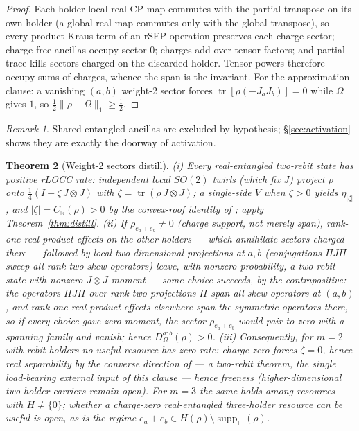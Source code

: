 \documentclass[11pt]{article}
\theoremstyle{plain}
\newtheorem{theorem}{Theorem}[section]
\theoremstyle{definition}
\theoremstyle{remark}
\newtheorem{remark}[theorem]{Remark}
\theoremstyle{plain}
\newcommand{\tr}{\operatorname{tr}}
\newcommand{\R}{\mathbb{R}}
\newcommand{\F}{\mathbb{F}}
\newcommand{\Om}{\Omega}
\newcommand{\suppF}{\operatorname{supp}_{\F}}
\begin{document}
\begin{proof}
Each holder-local real CP map commutes with the partial transpose
on its own holder (a global real map commutes only with the global
transpose), so every product Kraus term of an rSEP operation
preserves each charge sector; charge-free ancillas occupy sector
$0$; charges add over tensor factors; and partial trace kills
sectors charged on the discarded holder. Tensor powers therefore
occupy sums of charges, whence the span is the invariant. For the
approximation clause: a vanishing $(a,b)$ weight-2 sector forces
$\tr[\rho(-J_aJ_b)] = 0$ while $\Om$ gives $1$, so
$\tfrac12\|\rho-\Om\|_1\ge\tfrac12$.
\end{proof}

\begin{remark}
Shared entangled ancillas are excluded by hypothesis;
\S\ref{sec:activation} shows they are exactly the doorway of
activation.
\end{remark}

\begin{theorem}[Weight-2 sectors distill]\label{thm:w2}
(i) Every real-entangled two-rebit state has positive rLOCC rate:
independent local $SO(2)$ twirls (which fix $J$) project $\rho$
onto $\tfrac14(I + \zeta\,J\otimes J)$ with
$\zeta = \tr(\rho\,J\otimes J)$; a single-side $V$ when
$\zeta>0$ yields $\eta_{|\zeta|}$, and
$|\zeta| = C_\R(\rho)>0$ by the convex-roof identity of
\cite{cfr2001}; apply Theorem~\ref{thm:distill}. (ii) If
$\rho_{e_a+e_b}\neq0$ (charge support, not merely span), rank-one
real product effects on the other holders --- which annihilate
sectors charged there --- followed by local two-dimensional
projections at $a,b$ (conjugations $\Pi J\Pi$ sweep all rank-two
skew operators) leave, with nonzero probability, a two-rebit state
with nonzero $J\otimes J$ moment --- some choice succeeds, by the
contrapositive: the operators $\Pi J\Pi$ over rank-two projections
$\Pi$ span all skew operators at $(a,b)$, and rank-one real
product effects elsewhere span the symmetric operators there, so
if every choice gave zero moment, the sector $\rho_{e_a+e_b}$
would pair to zero with a spanning family and vanish; hence
$D^{a:b}_\Om(\rho)>0$.
(iii) Consequently, for $m = 2$ with rebit holders no useful
resource has zero rate: charge zero forces $\zeta = 0$, hence real
separability by the converse direction of \cite{cfr2001} --- a
two-rebit theorem, the single load-bearing external input of this
clause --- hence freeness (higher-dimensional two-holder carriers
remain open). For $m = 3$ the
same holds among resources with $H\neq\{0\}$; whether a
charge-zero real-entangled three-holder resource can be useful is
open, as is the regime
$e_a+e_b\in H(\rho)\setminus\suppF(\rho)$.
\end{theorem}
\end{document}
